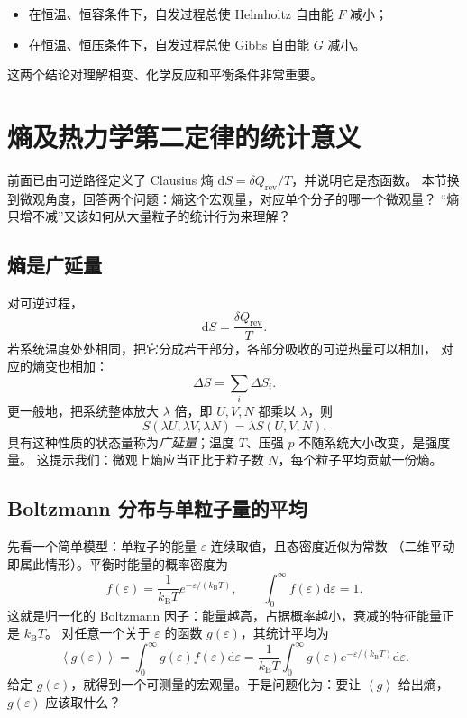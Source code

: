\documentclass[11pt,a4paper,openany]{ctexbook}
\newcommand{\dd}{\mathrm d}
\newcommand{\kb}{k_{\mathrm B}}
\newcommand{\avg}[1]{\left\langle #1\right\rangle}
\newcommand{\rev}{\mathrm{rev}}
\begin{document}
\begin{itemize}[leftmargin=2.2em]
\item 在恒温、恒容条件下，自发过程总使 Helmholtz 自由能 $F$ 减小；
\item 在恒温、恒压条件下，自发过程总使 Gibbs 自由能 $G$ 减小。
\end{itemize}

这两个结论对理解相变、化学反应和平衡条件非常重要。

\section{熵及热力学第二定律的统计意义}
前面已由可逆路径定义了 Clausius 熵 $\dd S=\delta Q_{\rev}/T$，并说明它是态函数。
本节换到微观角度，回答两个问题：熵这个宏观量，对应单个分子的哪一个微观量？
“熵只增不减”又该如何从大量粒子的统计行为来理解？

\subsection*{熵是广延量}
对可逆过程，
\[
\dd S=\frac{\delta Q_{\rev}}{T}.
\]
若系统温度处处相同，把它分成若干部分，各部分吸收的可逆热量可以相加，
对应的熵变也相加：
\[
\Delta S=\sum_i\Delta S_i .
\]
更一般地，把系统整体放大 $\lambda$ 倍，即 $U,V,N$ 都乘以 $\lambda$，则
\[
S(\lambda U,\lambda V,\lambda N)=\lambda S(U,V,N).
\]
具有这种性质的状态量称为\emph{广延量}；温度 $T$、压强 $p$ 不随系统大小改变，是强度量。
这提示我们：微观上熵应当正比于粒子数 $N$，每个粒子平均贡献一份熵。

\subsection*{Boltzmann 分布与单粒子量的平均}
先看一个简单模型：单粒子的能量 $\varepsilon$ 连续取值，且态密度近似为常数
（二维平动即属此情形）。平衡时能量的概率密度为
\[
\boxed{f(\varepsilon)=\frac{1}{\kb T}e^{-\varepsilon/(\kb T)}},\qquad
\int_0^\infty f(\varepsilon)\dd\varepsilon=1 .
\]
这就是归一化的 Boltzmann 因子：能量越高，占据概率越小，衰减的特征能量正是 $\kb T$。
对任意一个关于 $\varepsilon$ 的函数 $g(\varepsilon)$，其统计平均为
\[
\avg{g(\varepsilon)}
=\int_0^\infty g(\varepsilon)f(\varepsilon)\dd\varepsilon
=\frac{1}{\kb T}\int_0^\infty g(\varepsilon)e^{-\varepsilon/(\kb T)}\dd\varepsilon .
\]
给定 $g(\varepsilon)$，就得到一个可测量的宏观量。于是问题化为：要让 $\avg{g}$ 给出熵，
$g(\varepsilon)$ 应该取什么？
\end{document}
